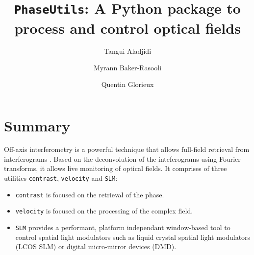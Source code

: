 \documentclass[aps,prl,groupedaddress,amsmath,amssymb]{revtex4-2}
\begin{document}

\title{\texttt{PhaseUtils}: A Python package to process and control optical fields}


\author{Tangui Aladjidi}
\author{Myrann Baker-Rasooli}
\author{Quentin Glorieux}

\maketitle

\section{Summary\label{summary}}

Off-axis interferometry is a powerful technique that allows full-field
retrieval from interferograms
\cite{lieblingComplexwaveRetrievalSingle2004}
\cite{verrierOffaxisDigitalHologram2011}. 
Based on the deconvolution of
the inteferograms using Fourier transforms, it allows live monitoring of
optical fields. 
It comprises of three utilities \texttt{contrast},
\texttt{velocity} and \texttt{SLM}:

\begin{itemize}
\item
  \texttt{contrast} is focused on the retrieval of the phase.
\item
  \texttt{velocity} is focused on the processing of the complex field.
\item
  \texttt{SLM} provides a performant, platform independant window-based
  tool to control spatial light modulators such as liquid crystal
  spatial light modulators (LCOS SLM) or digital micro-mirror devices
  (DMD).
\end{itemize}
\end{document}

